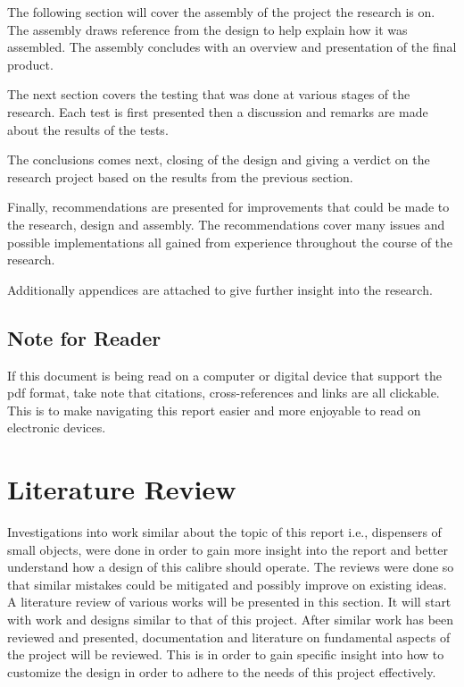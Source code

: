 \documentclass[a4paper,11pt]{article}
\numberwithin{figure}{section}
\numberwithin{table}{section}
\begin{document}
The following section will cover the assembly of the project the research is on. The assembly draws reference from the design to help explain how it was assembled. The assembly concludes with an overview and presentation of the final product.

The next section covers the testing that was done at various stages of the research. Each test is first presented then a discussion and remarks are made about the results of the tests.

The conclusions comes next, closing of the design and giving a verdict on the research project based on the results from the previous section.

Finally, recommendations are presented for improvements that could be made to the research, design and assembly. The recommendations cover many issues and possible implementations all gained from experience throughout the course of the research.

Additionally appendices are attached to give further insight into the research.
	\subsection{Note for Reader}
	If this document is being read on a computer or digital device that support the pdf format, take note that citations, cross-references and links are all clickable. This is to make navigating this report easier and more enjoyable to read on electronic devices.
	\newpage
\setlength{\parskip}{1em}
\section{Literature Review}\thispagestyle{sectionstart}
Investigations into work similar about the topic of this report i.e., dispensers of small objects, were done in order to gain more insight into the report and better understand how a design of this calibre should operate. The reviews were done so that similar mistakes could be mitigated and possibly improve on existing ideas. A literature review of various works will be presented in this section. It will start with work and designs similar to that of this project. After similar work has been reviewed and presented, documentation and literature on fundamental aspects of the project will be reviewed. This is in order to gain specific insight into how to customize the design in order to adhere to the needs of this project effectively. 
\end{document}
